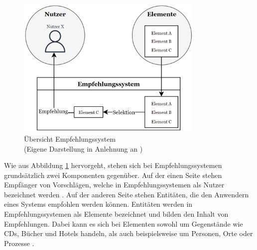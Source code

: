 \begin{figure}[H]
    \centering
	\includegraphics[width=0.8\textwidth]{gfx/komponenten-empfehlungssystem.png}
	\caption[Übersicht Empfehlungssystem]{Übersicht Empfehlungssystem\\
	(Eigene Darstellung in Anlehnung an \cite[S. 2]{klahold:book})}
	\label{fig:empfehlungssysteme:einführung:abb1}
\end{figure}

Wie aus Abbildung \ref{fig:empfehlungssysteme:einführung:abb1} hervorgeht, stehen sich bei Empfehlungssystemen grundsätzlich zwei Komponenten gegenüber.
Auf der einen Seite stehen Empfänger von Vorschlägen, welche in Empfehlungssystemen als Nutzer bezeichnet werden \cite[S. 8]{ricci:inbook}.
Auf der anderen Seite stehen Entitäten, die den Anwendern eines Systems empfohlen werden können.
Entitäten werden in Empfehlungssystemen als Elemente bezeichnet und bilden den Inhalt von Empfehlungen.
Dabei kann es sich bei Elementen sowohl um Gegenstände wie CDs, Bücher und Hotels handeln, als auch beispielsweise um Personen, Orte oder Prozesse \cite[S. 4]{klahold:book}.

